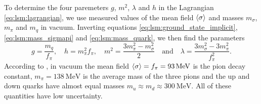 To determine the four paremeters $g$, $m^2$, $\lambda$ and $h$ in the Lagrangian \eqref{eq:lsm:lagrangian},
we use measured values of the mean field $\langle \sigma \rangle$ and masses $m_\sigma$, $m_\pi$ and $m_q$ in vacuum.
Inverting equations \eqref{eq:lsm:ground_state_implicit}, \eqref{eq:lsm:mass_sigmapi} and \eqref{eq:lsm:mass_quark}, we then find the parameters
\begin{equation}
	g       = \frac{m_q}{f_\pi}, \quad %
	h       = m_\pi^2 f_\pi, \quad %
	m^2     = \frac{3m_\pi^2 - m_\sigma^2}{2} \quad \text{and} \quad %
	\lambda = \frac{3 m_\sigma^2 - 3 m_\pi^2}{f_\pi^2} .    %
\label{eq:lsm:parameters}
\end{equation}
According to \cite{ref:pdg_review_2021}, in vacuum the mean field $\langle \sigma \rangle = f_\pi = \SI{93}{\mega\electronvolt}$ is the pion decay constant,
$m_\pi = \SI{138}{\mega\electronvolt}$ is the average mass of the three pions
and the up and down quarks have almost equal masses $m_u \approx m_d \approx \SI{300}{\mega\electronvolt}$.
All of these quantities have low uncertainty.

